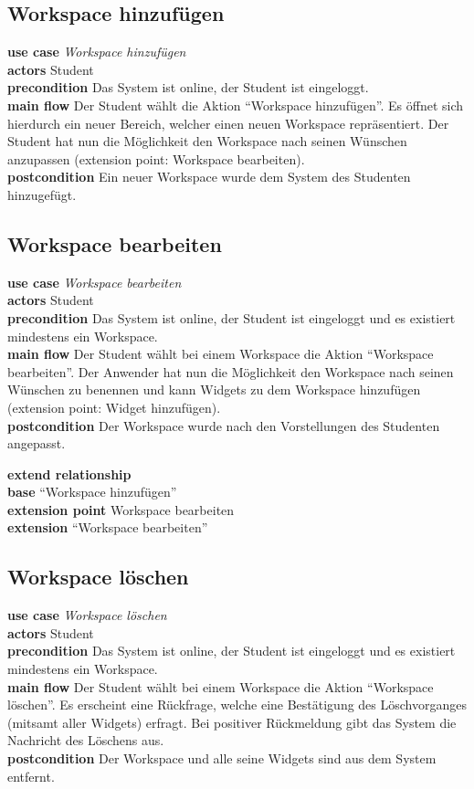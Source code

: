 \subsection{Workspace hinzufügen}
\textbf{use case} \emph{Workspace hinzufügen}\\
\textbf{actors} Student\\
\textbf{precondition} Das System ist online, der Student ist eingeloggt.\\
\textbf{main flow} Der Student wählt die Aktion "`Workspace hinzufügen"'. Es öffnet sich hierdurch ein neuer Bereich, welcher einen neuen Workspace repräsentiert. Der Student hat nun die Möglichkeit den Workspace nach seinen Wünschen anzupassen (extension point: Workspace bearbeiten).\\
\textbf{postcondition} Ein neuer Workspace wurde dem System des Studenten hinzugefügt.
 
\subsection{Workspace bearbeiten}
\textbf{use case} \emph{Workspace bearbeiten}\\
\textbf{actors} Student\\
\textbf{precondition} Das System ist online, der Student ist eingeloggt und es existiert mindestens ein Workspace.\\
\textbf{main flow} Der Student wählt bei einem Workspace die Aktion "`Workspace bearbeiten"'. Der Anwender hat nun die Möglichkeit den Workspace nach seinen Wünschen zu benennen und kann Widgets zu dem Workspace hinzufügen (extension point: Widget hinzufügen).\\
\textbf{postcondition} Der Workspace wurde nach den Vorstellungen des Studenten angepasst.
 
\textbf{extend relationship}\\
\textbf{base} "`Workspace hinzufügen"'\\
\textbf{extension point} Workspace bearbeiten\\
\textbf{extension} "`Workspace bearbeiten"'
 
\subsection{Workspace löschen}
\textbf{use case} \emph{Workspace löschen}\\
\textbf{actors} Student\\
\textbf{precondition} Das System ist online, der Student ist eingeloggt und es existiert mindestens ein Workspace.\\
\textbf{main flow} Der Student wählt bei einem Workspace die Aktion "`Workspace löschen"'. Es erscheint eine Rückfrage, welche eine Bestätigung des Löschvorganges (mitsamt aller Widgets) erfragt. Bei positiver Rückmeldung gibt das System die Nachricht des Löschens aus. \\
\textbf{postcondition} Der Workspace und alle seine Widgets sind aus dem System entfernt.


